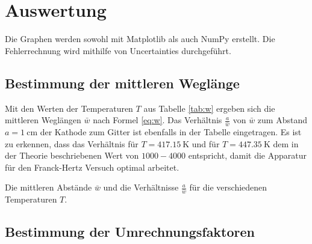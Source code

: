 \section{Auswertung}
\label{sec:Auswertung}

Die Graphen werden sowohl mit Matplotlib \cite{matplotlib} als auch NumPy \cite{numpy} erstellt. Die Fehlerrechnung wird mithilfe von Uncertainties \cite{uncertainties} durchgeführt.

\subsection{Bestimmung der mittleren Weglänge}

Mit den Werten der Temperaturen $T$ aus Tabelle \ref{tab:w} ergeben sich die mittleren Weglängen $\bar{w}$ nach Formel \eqref{eq:w}. Das Verhältnis $\frac{a}{\bar{w}}$ von $\bar{w}$ zum Abstand $a=\SI{1}{\centi\metre}$ der Kathode zum Gitter ist ebenfalls in der Tabelle eingetragen. Es ist zu erkennen, dass das Verhältnis für $T = \SI{417,15}{\kelvin}$ und für $T = \SI{447,35}{\kelvin}$ dem in der Theorie beschriebenen Wert von $1000-4000$ entspricht, damit die Apparatur für den Franck-Hertz Versuch optimal arbeitet.

\begin{table}
\centering
\caption{Die mittleren Abstände $\bar{w}$ und die Verhältnisse $\frac{a}{\bar{w}}$ für die verschiedenen Temperaturen $T$.}

\label{tab:w}
\end{table}

\subsection{Bestimmung der Umrechnungsfaktoren}

